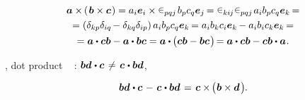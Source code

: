 \nopagebreak\vspace{-0.5em}\begin{multline}
\bm{a} \times \hspace{-0.15ex} \left(\hspace{.2ex}{\bm{b} \times \bm{c}}\hspace{.15ex}\right)
= a_i \bm{e}_i \times \permutationsparitysymbols{pqj} \hspace{.2ex} b_p c_q \bm{e}_j \hspace{-0.2ex}
= \permutationsparitysymbols{ki\hspace{-0.1ex}j} \permutationsparitysymbols{pqj} \hspace{.2ex} a_i b_p c_q \bm{e}_k \hspace{-0.2ex} =
\\
= \left({\delta_{kp}\delta_{iq} \hspace{-0.2ex} - \delta_{kq}\delta_{ip}}\right) a_i b_p c_q \bm{e}_k \hspace{-0.2ex}
= a_i b_k c_i \bm{e}_k \hspace{-0.15ex} - a_i b_i c_k \bm{e}_k \hspace{-0.2ex} =
\\
= \bm{a} \dotp \bm{c} \bm{b} - \bm{a} \dotp \bm{b} \bm{c}
= \bm{a} \dotp \hspace{-0.1ex} \bigl( \bm{c} \bm{b} - \bm{b} \bm{c} \hspace{.15ex} \bigr) \hspace{-0.3ex}
= \bm{a} \dotp \bm{c} \bm{b} - \bm{c} \bm{b} \dotp \bm{a}
\hspace{.1ex} .
\end{multline}

\vspace{-0.1em}\noindent
{}
,
dot product
~
\::
${\bm{b} \bm{d} \hspace{.1ex} \dotp \bm{c} \hspace{.25ex} \neq \hspace{.25ex} \bm{c} \hspace{.1ex} \dotp \bm{b} \bm{d}}$,

\nopagebreak\vspace{-1.2em}
\begin{equation}
\bm{b} \bm{d} \hspace{.1ex} \dotp \bm{c} \hspace{.25ex} - \hspace{.25ex} \bm{c} \hspace{.1ex} \dotp \bm{b} \bm{d}
\hspace{.25ex} = \hspace{.25ex}
\bm{c} \times \hspace{-0.2ex} \bigl( \hspace{.1ex} \bm{b} \times \bm{d} \hspace{.25ex} \bigr)
\hspace{-0.1ex} .
\end{equation}

